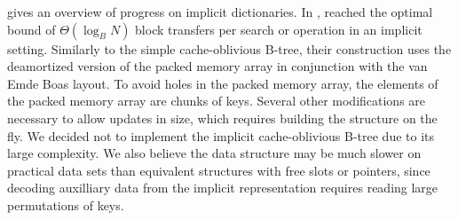 \cite{implicit-btrees-survey} gives an overview of progress on implicit
dictionaries.  In \citeyear{implicit-cob}, \citeauthor{implicit-cob} reached
the optimal bound of $\Theta(\log_B N)$ block transfers per search or operation
in an implicit setting. Similarly to the simple cache-oblivious B-tree, their
construction uses the deamortized version of the packed memory array
in conjunction with the van Emde Boas layout. To avoid holes in the packed
memory array, the elements of the packed memory array are chunks of keys.
Several other modifications are necessary to allow updates in size, which
requires building the structure on the fly.
We decided not to implement the implicit cache-oblivious B-tree due
to its large complexity. We also believe the data structure may be much
slower on practical data sets than equivalent structures with free slots or
pointers, since decoding auxilliary data from the implicit representation
requires reading large permutations of keys.
